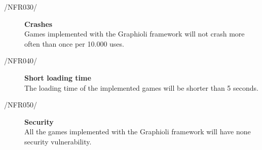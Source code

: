 \vspace{.5cm}

\begin{description}
  	\item[/NFR030/\label{NFR:030}] {\bf Crashes}  \hfill \\
	Games implemented with the Graphioli framework will not crash more often than once per 10.000 uses. \\
	\item[/NFR040/\label{NFR:040}] {\bf Short loading time} \\
	The loading time of the implemented games will be shorter than 5 seconds. \\
	\item[/NFR050/\label{NFR:050}] {\bf Security} \\
	All the games implemented with the Graphioli framework will have none security vulnerability.
\end{description}

